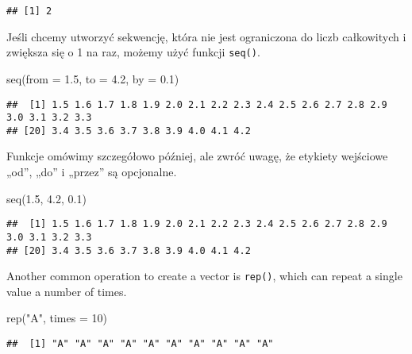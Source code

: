 \documentclass[
]{article}
\newenvironment{Shaded}{\begin{snugshade}}{\end{snugshade}}
\newcommand{\AttributeTok}[1]{\textcolor[rgb]{0.77,0.63,0.00}{#1}}
\newcommand{\DecValTok}[1]{\textcolor[rgb]{0.00,0.00,0.81}{#1}}
\newcommand{\FloatTok}[1]{\textcolor[rgb]{0.00,0.00,0.81}{#1}}
\newcommand{\FunctionTok}[1]{\textcolor[rgb]{0.00,0.00,0.00}{#1}}
\newcommand{\NormalTok}[1]{#1}
\newcommand{\StringTok}[1]{\textcolor[rgb]{0.31,0.60,0.02}{#1}}
\begin{document}
\begin{verbatim}
## [1] 2
\end{verbatim}

Jeśli chcemy utworzyć sekwencję, która nie jest ograniczona do liczb
całkowitych i zwiększa się o 1 na raz, możemy użyć funkcji
\texttt{seq()}.

\begin{Shaded}
\begin{Highlighting}[]
\FunctionTok{seq}\NormalTok{(}\AttributeTok{from =} \FloatTok{1.5}\NormalTok{, }\AttributeTok{to =} \FloatTok{4.2}\NormalTok{, }\AttributeTok{by =} \FloatTok{0.1}\NormalTok{)}
\end{Highlighting}
\end{Shaded}

\begin{verbatim}
##  [1] 1.5 1.6 1.7 1.8 1.9 2.0 2.1 2.2 2.3 2.4 2.5 2.6 2.7 2.8 2.9 3.0 3.1 3.2 3.3
## [20] 3.4 3.5 3.6 3.7 3.8 3.9 4.0 4.1 4.2
\end{verbatim}

Funkcje omówimy szczegółowo później, ale zwróć uwagę, że etykiety
wejściowe „od'', „do'' i „przez'' są opcjonalne.

\begin{Shaded}
\begin{Highlighting}[]
\FunctionTok{seq}\NormalTok{(}\FloatTok{1.5}\NormalTok{, }\FloatTok{4.2}\NormalTok{, }\FloatTok{0.1}\NormalTok{)}
\end{Highlighting}
\end{Shaded}

\begin{verbatim}
##  [1] 1.5 1.6 1.7 1.8 1.9 2.0 2.1 2.2 2.3 2.4 2.5 2.6 2.7 2.8 2.9 3.0 3.1 3.2 3.3
## [20] 3.4 3.5 3.6 3.7 3.8 3.9 4.0 4.1 4.2
\end{verbatim}

Another common operation to create a vector is \texttt{rep()}, which can
repeat a single value a number of times.

\begin{Shaded}
\begin{Highlighting}[]
\FunctionTok{rep}\NormalTok{(}\StringTok{"A"}\NormalTok{, }\AttributeTok{times =} \DecValTok{10}\NormalTok{)}
\end{Highlighting}
\end{Shaded}

\begin{verbatim}
##  [1] "A" "A" "A" "A" "A" "A" "A" "A" "A" "A"
\end{verbatim}
\end{document}
